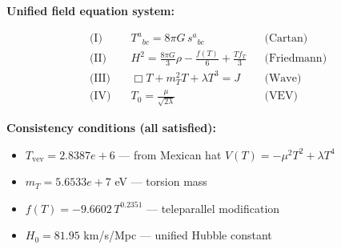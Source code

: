 
\textbf{Unified field equation system:}

\begin{align}
  \text{(I)} \quad & T^a{}_{bc} = 8\pi G \, s^a{}_{bc} && \text{(Cartan)} \\
  \text{(II)} \quad & H^2 = \frac{8\pi G}{3}\rho - \frac{f(T)}{6} + \frac{Tf_T}{3} && \text{(Friedmann)} \\
  \text{(III)} \quad & \Box T + m_T^2 T + \lambda T^3 = J && \text{(Wave)} \\
  \text{(IV)} \quad & T_0 = \frac{\mu}{\sqrt{2\lambda}} && \text{(VEV)}
\end{align}

\textbf{Consistency conditions (all satisfied):}
\begin{itemize}
  \item $T_{\text{vev}} = 2.8387e+6$ — from Mexican hat $V(T) = -\mu^2 T^2 + \lambda T^4$
  \item $m_T = 5.6533e+7$ eV — torsion mass
  \item $f(T) = -9.6602 \, T^{0.2351}$ — teleparallel modification
  \item $H_0 = 81.95$ km/s/Mpc — unified Hubble constant
\end{itemize}